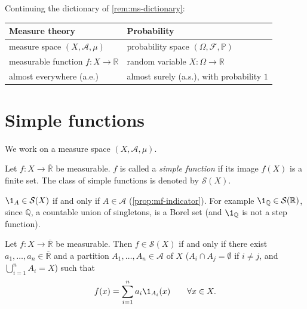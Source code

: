 \begin{remark}[Dictionary]\label{rem:mf-dictionary}
Continuing the dictionary of \cref{rem:ms-dictionary}:
\begin{center}
\begin{tabular}{@{}ll@{}}
\toprule
Measure theory & Probability\\
\midrule
measure space $(X,\mathcal A,\mu)$ & probability space $(\Omega,\mathcal F,\mathbb P)$\\
measurable function $f:X\to\mathbb R$ & random variable $X:\Omega\to\mathbb R$\\
almost everywhere (a.e.) & almost surely (a.s.), with probability $1$\\
\bottomrule
\end{tabular}
\end{center}
\end{remark}

\section{Simple functions}\label{sec:mf-simple}

We work on a measure space $(X,\mathcal A,\mu)$.

\begin{definition}\label{def:mf-simple}
Let $f:X\to\overline{\mathbb R}$ be measurable. $f$ is called a \emph{simple function} if its
image $f(X)$ is a finite set. The class of simple functions is denoted by $\mathcal S(X)$.
\end{definition}

\begin{remark}\label{rem:mf-indicator-simple}
$\1_A\in\mathcal S(X)$ if and only if $A\in\mathcal A$ (\cref{prop:mf-indicator}). For
example $\1_{\mathbb Q}\in\mathcal S(\mathbb R)$, since $\mathbb Q$, a countable union
of singletons, is a Borel set (and $\1_{\mathbb Q}$ is not a step function).
\end{remark}

\begin{proposition}\label{prop:mf-canonical}
Let $f:X\to\overline{\mathbb R}$ be measurable. Then $f\in\mathcal S(X)$ if and only if there
exist $a_1,\dots,a_n\in\overline{\mathbb R}$ and a partition $A_1,\dots,A_n\in\mathcal A$ of $X$
($A_i\cap A_j=\emptyset$ if $i\ne j$, and $\bigcup_{i=1}^nA_i=X$) such that
\begin{equation}\label{eq:mf-canonical}
  f(x)=\sum_{i=1}^na_i\1_{A_i}(x)\qquad\forall x\in X .
\end{equation}
\end{proposition}

